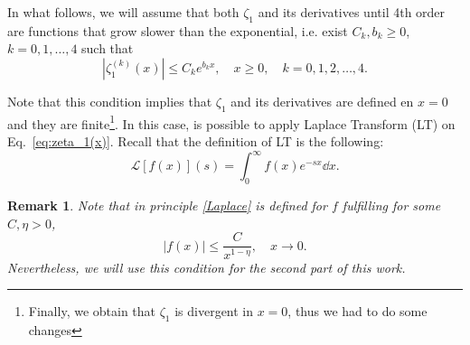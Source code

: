 \documentclass[%
 aip,
 jmp,%
 amsmath,amssymb,
 reprint,%
]{revtex4-2}
\begin{document}
In what follows, we will assume that both $\zeta_1$ and its derivatives until 4th order are functions that grow slower than the exponential, i.e. exist $C_k, b_k\geq 0$, $k=0,1,\ldots, 4$ such that
\[
|\zeta_1^{(k)}(x)| \le C_k e^{b_k x}, \quad x\ge 0, \quad k=0,1,2,\ldots, 4.
\]

Note that this condition implies that $\zeta_1$ and its derivatives are defined en $x = 0$ and they are finite\footnote{Finally, we obtain that $\zeta_1$ is divergent in $x = 0$, thus we had to do some changes}. In this case, is possible to apply Laplace Transform (LT) on Eq.~\eqref{eq:zeta_1(x)}. Recall that the definition of LT is the following:
\begin{equation}\label{Laplace}
    \mathcal{L}\left[f(x)\right](s)=\int_0^\infty f(x)e^{-sx}\dd{x}.
\end{equation}
\newtheorem*{remark}{Remark}
\begin{remark}
Note that in principle \eqref{Laplace} is defined for $f$ fulfilling for some $C,\eta>0$,
\[
|f(x)| \leq \frac{C}{x^{1-\eta}}, \quad x\to 0.
\]
Nevertheless, we will use this condition for the second part of this work.
\end{remark}



\medskip
\end{document}
